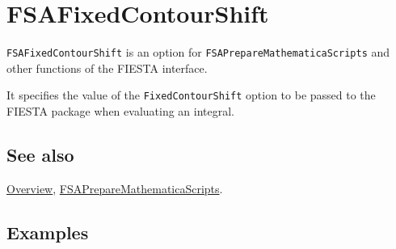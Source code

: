 \documentclass[../FeynHelpersManual.tex]{subfiles}
\begin{document}
\hypertarget{fsafixedcontourshift}{
\section{FSAFixedContourShift}\label{fsafixedcontourshift}}

\texttt{FSAFixedContourShift} is an option for
\texttt{FSAPrepareMathematicaScripts} and other functions of the FIESTA
interface.

It specifies the value of the \texttt{FixedContourShift} option to be
passed to the FIESTA package when evaluating an integral.

\subsection{See also}

\hyperlink{toc}{Overview},
\hyperlink{fsapreparemathematicascripts}{FSAPrepareMathematicaScripts}.

\subsection{Examples}
\end{document}
